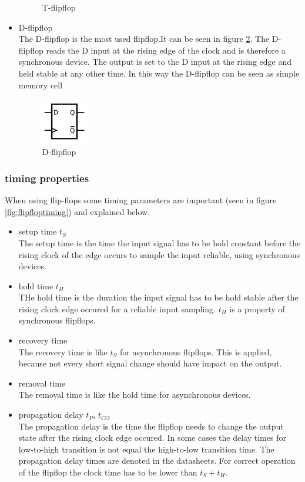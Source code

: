 \begin{itemize}
\begin{figure}[htbp]
\begin{center}
\caption{T-flipflop}
\label{fig:tflipflop}
\end{center}
\end{figure}
\item D-flipflop\\
The D-flipflop is the most used flipflop.It can be seen in figure \ref{fig:dflipflop}. The D-flipflop reads the D input at the rising edge of the clock and is therefore a synchronous device. The output is set to the D input at the rising edge and held stable at any other time. In this way the D-flipflop can be seen as simple memory cell
\begin{figure}[htbp]
\begin{center}
\includegraphics[width=2cm,keepaspectratio=true]{bilder/png/Dflipflop}
\caption{D-flipflop}
\label{fig:dflipflop}
\end{center}
\end{figure}
\end{itemize}
\subsubsection{timing properties}
When using flip-flops some timing parameters are important (seen in figure \ref{fig:flipfloptiming}) and explained below.
\begin{itemize}
\item setup time $t_{S}$\\
The setup time is the time the input signal has to be hold constant before the rising clock of the edge occurs to sample the input reliable, using synchronous devices.
\item hold time $t_{H}$\\
THe hold time is the duration the input signal has to be hold stable after the rising clock edge occured for a reliable input sampling. $t_{H}$ is a property of synchronous flipflops.
\item recovery time\\
The recovery time is like $t_{S}$ for asynchronous flipflops. This is applied, because not every short signal change should have impact on the output. 
\item removal time\\
The removal time is like the hold time for asynchronous devices.
\item propagation delay $t_{P}$, $t_{CO}$\\
The propagation delay is the time the flipflop needs to change the output state after the rising clock edge occured. In some cases the delay times for low-to-high transition is not equal the high-to-low transition time. The propagation delay times are denoted in the datasheets. For correct operation of the flipflop the clock time has to be lower than $t_{S}+t_{H}$.
\end{itemize}
